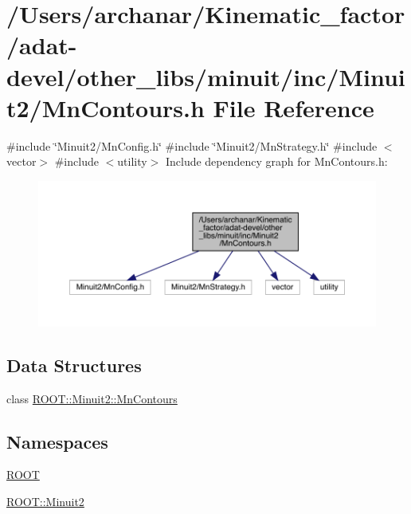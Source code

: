 \hypertarget{adat-devel_2other__libs_2minuit_2inc_2Minuit2_2MnContours_8h}{}\section{/\+Users/archanar/\+Kinematic\+\_\+factor/adat-\/devel/other\+\_\+libs/minuit/inc/\+Minuit2/\+Mn\+Contours.h File Reference}
\label{adat-devel_2other__libs_2minuit_2inc_2Minuit2_2MnContours_8h}
{\ttfamily \#include \char`\"{}Minuit2/\+Mn\+Config.\+h\char`\"{}}\newline
{\ttfamily \#include \char`\"{}Minuit2/\+Mn\+Strategy.\+h\char`\"{}}\newline
{\ttfamily \#include $<$vector$>$}\newline
{\ttfamily \#include $<$utility$>$}\newline
Include dependency graph for Mn\+Contours.\+h\+:
\nopagebreak
\begin{figure}[H]
\begin{center}
\leavevmode
\includegraphics[width=350pt]{d1/d24/adat-devel_2other__libs_2minuit_2inc_2Minuit2_2MnContours_8h__incl}
\end{center}
\end{figure}
\subsection*{Data Structures}
\begin{DoxyCompactItemize}
\item 
class \mbox{\hyperlink{classROOT_1_1Minuit2_1_1MnContours}{R\+O\+O\+T\+::\+Minuit2\+::\+Mn\+Contours}}
\end{DoxyCompactItemize}
\subsection*{Namespaces}
\begin{DoxyCompactItemize}
\item 
 \mbox{\hyperlink{namespaceROOT}{R\+O\+OT}}
\item 
 \mbox{\hyperlink{namespaceROOT_1_1Minuit2}{R\+O\+O\+T\+::\+Minuit2}}
\end{DoxyCompactItemize}
